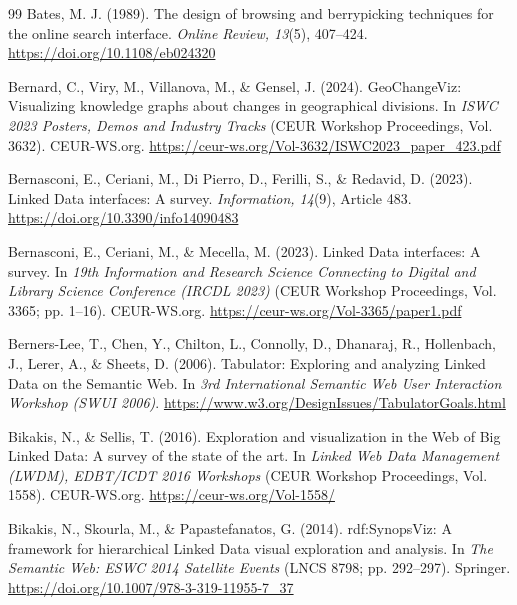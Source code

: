 \documentclass[manuscript,review,screen]{acmart}
\begin{document}
\begin{thebibliography}{99}
\setlength{\bibhang}{1.5em}
\setlength{\bibsep}{0.45em}
 Bates, M. J. (1989). The design of browsing and berrypicking techniques for the online search interface. \textit{Online Review, 13}(5), 407--424. \url{https://doi.org/10.1108/eb024320}

 Bernard, C., Viry, M., Villanova, M., \& Gensel, J. (2024). GeoChangeViz: Visualizing knowledge graphs about changes in geographical divisions. In \textit{ISWC 2023 Posters, Demos and Industry Tracks} (CEUR Workshop Proceedings, Vol. 3632). CEUR-WS.org. \url{https://ceur-ws.org/Vol-3632/ISWC2023_paper_423.pdf}

 Bernasconi, E., Ceriani, M., Di Pierro, D., Ferilli, S., \& Redavid, D. (2023). Linked Data interfaces: A survey. \textit{Information, 14}(9), Article 483. \url{https://doi.org/10.3390/info14090483}

 Bernasconi, E., Ceriani, M., \& Mecella, M. (2023). Linked Data interfaces: A survey. In \textit{19th Information and Research Science Connecting to Digital and Library Science Conference (IRCDL 2023)} (CEUR Workshop Proceedings, Vol. 3365; pp. 1--16). CEUR-WS.org. \url{https://ceur-ws.org/Vol-3365/paper1.pdf}

 Berners-Lee, T., Chen, Y., Chilton, L., Connolly, D., Dhanaraj, R., Hollenbach, J., Lerer, A., \& Sheets, D. (2006). Tabulator: Exploring and analyzing Linked Data on the Semantic Web. In \textit{3rd International Semantic Web User Interaction Workshop (SWUI 2006)}. \url{https://www.w3.org/DesignIssues/TabulatorGoals.html}

 Bikakis, N., \& Sellis, T. (2016). Exploration and visualization in the Web of Big Linked Data: A survey of the state of the art. In \textit{Linked Web Data Management (LWDM), EDBT/ICDT 2016 Workshops} (CEUR Workshop Proceedings, Vol. 1558). CEUR-WS.org. \url{https://ceur-ws.org/Vol-1558/}

 Bikakis, N., Skourla, M., \& Papastefanatos, G. (2014). rdf:SynopsViz: A framework for hierarchical Linked Data visual exploration and analysis. In \textit{The Semantic Web: ESWC 2014 Satellite Events} (LNCS 8798; pp. 292--297). Springer. \url{https://doi.org/10.1007/978-3-319-11955-7_37}


\end{thebibliography}
\end{document}

